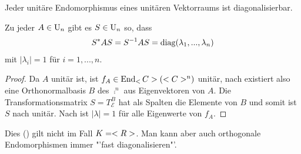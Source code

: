 \begin{conclusion}
	Jeder unitäre Endomorphismus eines unitären Vektorraums ist diagonalisierbar.
\end{conclusion}

\begin{conclusion}
	Zu jeder $A\in\operatorname{U}_n$ gibt es $S\in\operatorname{U}_n$ so, dass 
	\begin{align}
		S^*AS=S^{-1}AS=\operatorname{diag}(\lambda_1,...,\lambda_n)\notag
	\end{align}
	mit $\vert\lambda_i\vert=1$ für $i=1,...,n$.
\end{conclusion}
\begin{proof}
	Da $A$ unitär ist, ist $f_A\in\End_\comp(\comp^n)$ unitär, nach  existiert also eine Orthonormalbasis $B$ des $\comp^n$ aus Eigenvektoren von $A$. Die Transformationsmatrix $S=T_{\mathcal{E}}^B$ hat als Spalten die Elemente von $B$ und somit ist $S$ nach  unitär. Nach  ist $\vert\lambda\vert=1$ für alle Eigenwerte von $f_A$.
\end{proof}

\begin{remark}
	Dies () gilt nicht im Fall $K=<R>$. Man kann aber auch orthogonale Endomorphismen immer "'fast diagonalisieren"'.
\end{remark}